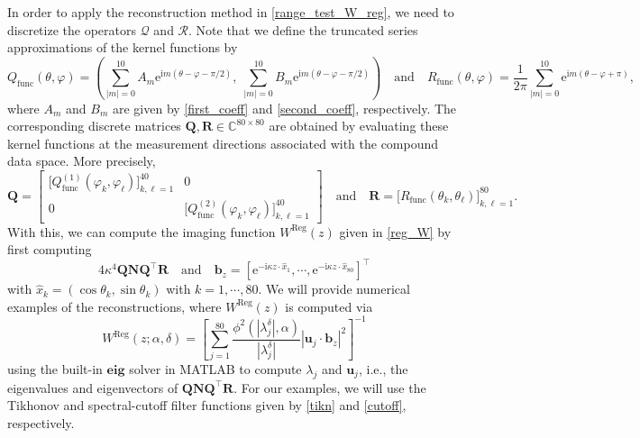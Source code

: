 \documentclass{article}
\begin{document}
In order to apply the reconstruction method in \eqref{range_test_W_reg}, we need to discretize the operators $\mathcal Q$ and $\mathcal R$. 
Note that we define the truncated series approximations of the kernel functions by
\[
Q_{\mathrm{func}}(\theta,\varphi)
=
\left(
\sum_{|m|=0}^{10}A_m \mathrm e^{\mathrm im(\theta-\varphi-\pi/2)},
\;
\sum_{|m|=0}^{10}B_m \mathrm e^{\mathrm im(\theta-\varphi-\pi/2)}
\right)
\quad\text{and}\quad
R_{\mathrm{func}}(\theta,\varphi)
=
\frac{1}{2\pi}
\sum_{|m|=0}^{10}
\mathrm e^{\mathrm im(\theta-\varphi+\pi)},
\]
where $A_m$ and $B_m$ are given by \eqref{first_coeff} and \eqref{second_coeff}, respectively. The corresponding discrete matrices
$\mathbf Q,\mathbf R\in\mathbb{C}^{80\times80}$
are obtained by evaluating these kernel functions at the measurement directions
associated with the compound data space. More precisely,
\[
\mathbf Q=
\begin{bmatrix}
\bigl[Q_{\mathrm{func}}^{(1)}(\varphi_k,\varphi_\ell)\bigr]_{k,\ell=1}^{40} & 0\\[2mm]
0 &\bigl[Q_{\mathrm{func}}^{(2)}(\varphi_k,\varphi_\ell)\bigr]_{k,\ell=1}^{40}
\end{bmatrix}
\quad\text{and}\quad
\mathbf R=
\bigl[R_{\mathrm{func}}(\theta_k,\theta_\ell)\bigr]_{k,\ell=1}^{80}.
\]
 With this, we can compute the imaging function $W^{\mathrm{Reg}}(z)$ given in \eqref{reg_W} by first computing
\[
4\kappa^4\mathbf Q\mathbf N\mathbf Q^\top \mathbf R\quad \text{and}\quad \mathbf b_z=[\mathrm e^{-\mathrm i\kappa z\cdot \hat x_1},\cdots, \mathrm e^{-\mathrm i\kappa z\cdot \hat x_{80}}]^\top
\]
with $\hat x_k=(\cos \theta_k,\sin \theta_k)$ with $k=1,\cdots, 80$.
We will provide numerical examples of the reconstructions, where $W^{\mathrm{Reg}}(z)$ is computed via
\begin{equation}
\label{reg2_W}
W^{\mathrm{Reg}}(z;\alpha,\delta)
=
\left[
\sum_{j=1}^{80}
\frac{
\phi^2(|\lambda_j^\delta|,\alpha)
}{
|\lambda_j^\delta|
}
\left|
\mathbf{u}_j\cdot \mathbf{b}_z
\right|^2
\right]^{-1}
\end{equation}
using the built-in $\mathbf{eig}$ solver in \textsf{MATLAB} to compute $\lambda_j$ and $\mathbf u_j$, i.e., the eigenvalues and eigenvectors of $\mathbf Q\mathbf N\mathbf Q^\top\mathbf R$. For our examples, we will use the Tikhonov and spectral-cutoff filter functions given by \eqref{tikn} and \eqref{cutoff}, respectively.
\end{document}
